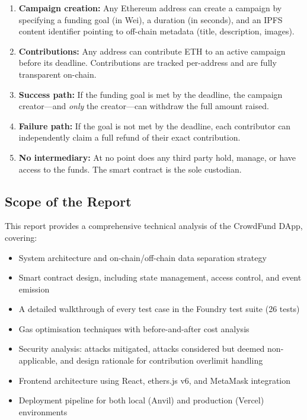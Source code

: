 \begin{enumerate}[leftmargin=1.5em]
    \item \textbf{Campaign creation:} Any Ethereum address can create a campaign by specifying a funding goal (in Wei), a duration (in seconds), and an IPFS content identifier pointing to off-chain metadata (title, description, images).
    \item \textbf{Contributions:} Any address can contribute ETH to an active campaign before its deadline. Contributions are tracked per-address and are fully transparent on-chain.
    \item \textbf{Success path:} If the funding goal is met by the deadline, the campaign creator---and \emph{only} the creator---can withdraw the full amount raised.
    \item \textbf{Failure path:} If the goal is not met by the deadline, each contributor can independently claim a full refund of their exact contribution.
    \item \textbf{No intermediary:} At no point does any third party hold, manage, or have access to the funds. The smart contract is the sole custodian.
\end{enumerate}

\subsection{Scope of the Report}

This report provides a comprehensive technical analysis of the CrowdFund DApp, covering:

\begin{itemize}[leftmargin=1.5em]
    \item System architecture and on-chain/off-chain data separation strategy
    \item Smart contract design, including state management, access control, and event emission
    \item A detailed walkthrough of every test case in the Foundry test suite (26 tests)
    \item Gas optimisation techniques with before-and-after cost analysis
    \item Security analysis: attacks mitigated, attacks considered but deemed non-applicable, and design rationale for contribution overlimit handling
    \item Frontend architecture using React, ethers.js v6, and MetaMask integration
    \item Deployment pipeline for both local (Anvil) and production (Vercel) environments
\end{itemize}
